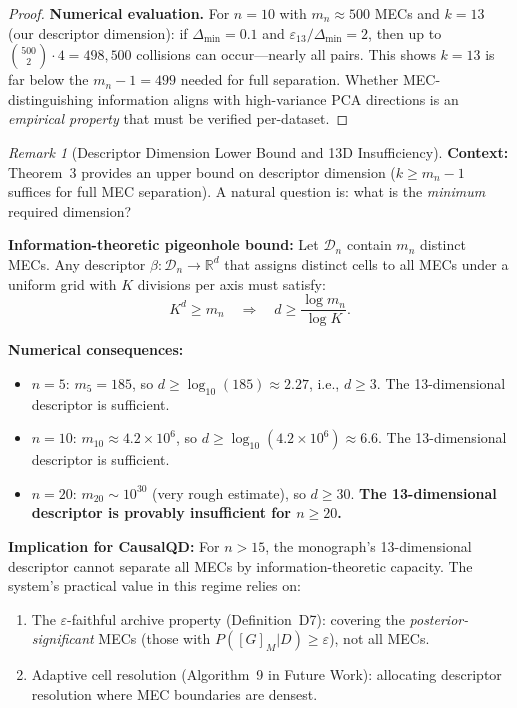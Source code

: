 \documentclass{article}
\theoremstyle{definition}
\theoremstyle{plain}
\theoremstyle{remark}
\newtheorem{remark}{Remark}
\begin{document}
\begin{proof}
\textbf{Numerical evaluation.}
For $n = 10$ with $m_n \approx 500$ MECs and $k = 13$ (our descriptor dimension):
if $\Delta_{\min} = 0.1$ and $\varepsilon_{13}/\Delta_{\min} = 2$, then up to
$\binom{500}{2} \cdot 4 = 498{,}500$ collisions can occur---nearly all pairs.
This shows $k = 13$ is far below the $m_n - 1 = 499$ needed for full separation.
Whether MEC-distinguishing information aligns with high-variance PCA directions
is an \emph{empirical property} that must be verified per-dataset.
\end{proof}

\begin{remark}[Descriptor Dimension Lower Bound and 13D Insufficiency]
\label{rem:descriptor_dimension}
\textbf{Context:} Theorem~3 provides an upper bound on descriptor dimension ($k \geq m_n - 1$
suffices for full MEC separation). A natural question is: what is the \emph{minimum}
required dimension?

\textbf{Information-theoretic pigeonhole bound:} Let $\mathcal{D}_n$ contain $m_n$
distinct MECs. Any descriptor $\beta : \mathcal{D}_n \to \mathbb{R}^d$ that assigns
distinct cells to all MECs under a uniform grid with $K$ divisions per axis must
satisfy:
\begin{equation}
K^d \geq m_n \quad \Longrightarrow \quad d \geq \frac{\log m_n}{\log K}.
\end{equation}

\textbf{Numerical consequences:}
\begin{itemize}
  \item $n = 5$: $m_5 = 185$, so $d \geq \log_{10}(185) \approx 2.27$, i.e., $d \geq 3$.
    The 13-dimensional descriptor is sufficient.
  \item $n = 10$: $m_{10} \approx 4.2 \times 10^6$, so $d \geq \log_{10}(4.2 \times 10^6) \approx 6.6$.
    The 13-dimensional descriptor is sufficient.
  \item $n = 20$: $m_{20} \sim 10^{30}$ (very rough estimate), so $d \geq 30$.
    \textbf{The 13-dimensional descriptor is provably insufficient for $n \geq 20$.}
\end{itemize}

\textbf{Implication for CausalQD:} For $n > 15$, the monograph's 13-dimensional
descriptor cannot separate all MECs by information-theoretic capacity. The system's
practical value in this regime relies on:
\begin{enumerate}
  \item The $\varepsilon$-faithful archive property (Definition~D7): covering the
    \emph{posterior-significant} MECs (those with $P([G]_M | D) \geq \varepsilon$),
    not all MECs.
  \item Adaptive cell resolution (Algorithm~9 in Future Work): allocating descriptor
    resolution where MEC boundaries are densest.
\end{enumerate}


\end{remark}
\end{document}
